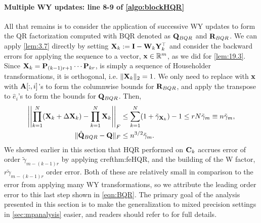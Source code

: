 \paragraph{Multiple WY updates: line 8-9 of \cref{algo:blockHQR}}
All that remains is to consider the application of successive WY updates to form the QR factorization computed with BQR denoted as $\mathbf{Q}_{BQR}$ and $\mathbf{R}_{BQR}$. 
We can apply \cref{lem:3.7} directly by setting $\mathbf{X}_{k}:= \mathbf{I}-\mathbf{W}_{k}\mathbf{Y}_{k}^{\top}$ and consider the backward errors for applying the sequence to a vector, $\mathbf{x}\in\mathbb{R}^{m}$, as we did for \cref{lem:19.3}. 
Since $\mathbf{X}_{k}=\mathbf{P}_{(k-1)r+1}\cdots\mathbf{P}_{kr}$, is simply a sequence of Householder transformations, it is orthogonal, i.e. $\|\mathbf{X}_{k}\|_2=1$.
We only need to replace with $\mathbf{x}$ with $\mathbf{A}[:,i]$'s to form the columnwise bounds for $\mathbf{R}_{BQR}$, and apply the transpose to $\hat{e}_i$'s to form the bounds for $\mathbf{Q}_{BQR}$. 
Then, 
\begin{align}
\left|\left|\prod_{k=1}^N (\bb{X}_{k} + \Delta \bb{X}_{k})- \prod_{k=1}^N\bb{X}_{k} \right|\right|_F &\leq\sum_{k=1}^N (1+\tilde{\gamma}_{\bb{X}_{k}})  -1 \leq rN\tilde{\gamma}_m \equiv n\tilde{\gamma}_m ,\label{eqn:BQR-mp}\\%
\|\hat{\bb{Q}}_{BQR}-\bb{Q}\|_F&\leq n^{3/2}\tilde{\gamma}_m. \label{eqn:BQR}
\end{align}
We showed earlier in this section that HQR performed on $\mathbf{C}_{k}$ accrues error of order $\tilde{\gamma}_{m-(k-1)r}$ by applying cref{thm:feHQR}, and the building of the W factor, $r\tilde{\gamma}_{m-(k-1)r}$ order error.
Both of these are relatively small in comparison to the error from applying many WY transformations, so we attribute the leading order error to this last step shown in \cref{eqn:BQR}.
The primary goal of the analysis presented in this section is to make the generalization to mixed precision settings in \cref{sec:mpanalysis} easier, and readers should refer to \cite{golub2013matrix,Higham2002} for full details.